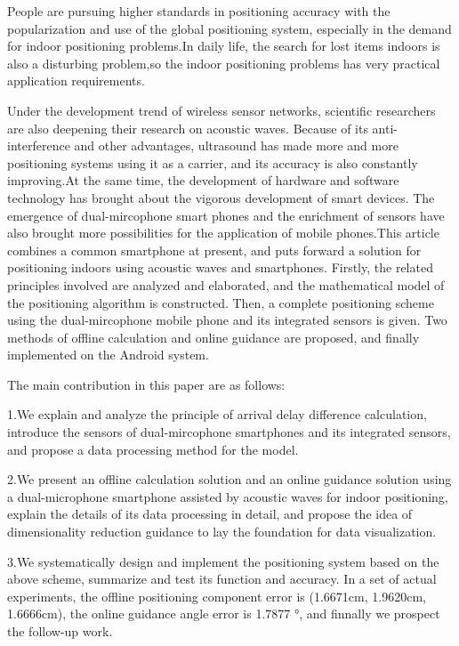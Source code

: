 \documentclass[winfonts,oneside]{njuthesis}
\begin{document}
\begin{englishabstract}
	
	People are pursuing higher standards in positioning accuracy with the popularization and use of the global positioning system, especially in the demand for indoor positioning problems.In daily life, the search for lost items indoors is also a disturbing problem,so the indoor positioning problems has very practical application requirements.
		
	Under the development trend of wireless sensor networks, scientific researchers are also deepening their research on acoustic waves. Because of its anti-interference and other advantages, ultrasound has made more and more positioning systems using it as a carrier, and its accuracy is also constantly improving.At the same time, the development of hardware and software technology has brought about the vigorous development of smart devices. The emergence of dual-mircophone smart phones and the enrichment of sensors have also brought more possibilities for the application of mobile phones.This article combines a common smartphone at present, and puts forward a solution for positioning indoors using acoustic waves and smartphones. Firstly, the related principles involved are analyzed and elaborated, and the mathematical model of the positioning algorithm is constructed. Then, a complete positioning scheme using the dual-mircophone mobile phone and its integrated sensors is given. Two methods of offline calculation and online guidance are proposed, and finally implemented on the Android system.

	The main contribution in this paper are as follows: 
	
	1.We explain and analyze the principle of arrival delay difference calculation, introduce the sensors of dual-mircophone smartphones and its integrated sensors, and propose a data processing method for the model.
	
	2.We present an offline calculation solution and an online guidance solution using a dual-microphone smartphone assisted by acoustic waves for indoor positioning, explain the details of its data processing in detail, and propose the idea of dimensionality reduction guidance to lay the foundation for data visualization.
	
	3.We systematically design and implement the positioning system based on the above scheme, summarize and test its function and accuracy. In a set of actual experiments, the offline positioning component error is (1.6671cm, 1.9620cm, 1.6666cm), the online guidance angle error is 1.7877 °, and finnally we prospect the follow-up work.

\end{englishabstract}
\end{document}

